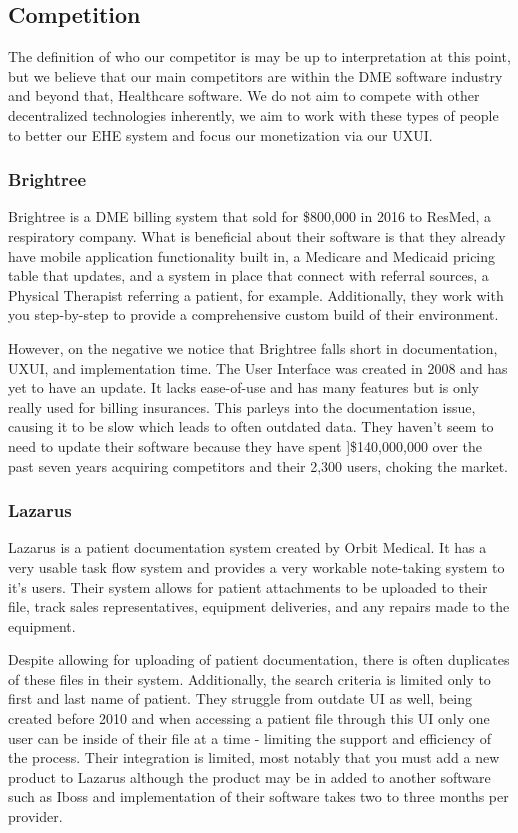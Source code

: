 \documentclass[12pt]{article}
\begin{document}
  \subsection{Competition}
  The definition of who our competitor is may be up to interpretation at this point, but we believe that our main competitors are within the DME software industry and beyond that, Healthcare software. We do not aim to compete with other decentralized technologies inherently, we aim to work with these types of people to better our EHE system and focus our monetization via our UXUI.

    \subsubsection{Brightree}
    Brightree is a DME billing system that sold for \$800,000 in 2016 to ResMed, a respiratory company. What is beneficial about their software is that they already have mobile application functionality built in, a Medicare and Medicaid pricing table that updates, and a system in place that connect with referral sources, a Physical Therapist referring a patient, for example. Additionally, they work with you step-by-step to provide a comprehensive custom build of their environment.

    However, on the negative we notice that Brightree falls short in documentation, UXUI, and implementation time. The User Interface was created in 2008 and has yet to have an update. It lacks ease-of-use and has many features but is only really used for billing insurances. This parleys into the documentation issue, causing it to be slow which leads to often outdated data. They haven’t seem to need to update their software because they have spent ]\$140,000,000 over the past seven years acquiring competitors and their 2,300 users, choking the market.

    \subsubsection{Lazarus}
    Lazarus is a patient documentation system created by Orbit Medical. It has a very usable task flow system and provides a very workable note-taking system to it’s users. Their system allows for patient attachments to be uploaded to their file, track sales representatives, equipment deliveries, and any repairs made to the equipment.

    Despite allowing for uploading of patient documentation, there is often duplicates of these files in their system. Additionally, the search criteria is limited only to first and last name of patient. They struggle from outdate UI as well, being created before 2010 and when accessing a patient file through this UI only one user can be inside of their file at a time - limiting the support and efficiency of the process. Their integration is limited, most notably that you must add a new product to Lazarus although the product may be in added to another software such as Iboss and implementation of their software takes two to three months per provider.
\end{document}
